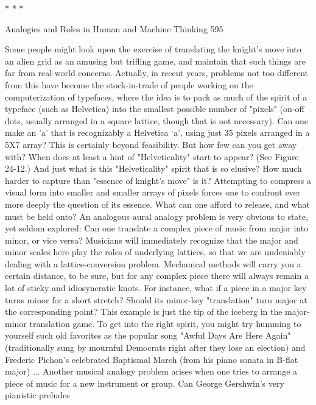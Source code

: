                                       *    *    *




Analogies and Roles in Human and Machine Thinking                                   595

        Some people might look upon the exercise of translating the knight's move
into an alien grid as an amusing but trifling game, and maintain that such things are
far from real-world concerns. Actually, in recent years, problems not too different
from this have become the stock-in-trade of people working on the computerization of
typefaces, where the idea is to pack as much of the spirit of a typeface (such as
Helvetica) into the smallest possible number of "pixels" (on-off dots, usually arranged
in a square lattice, though that is not necessary). Can one make an 'a' that is
recognizably a Helvetica `a', using just 35 pixels arranged in a 5X7 array? This is
certainly beyond feasibility. But how few can you get away with? When does at least
a hint of "Helveticality" start to appear? (See Figure 24-12.) And just what is this
"Helveticality" spirit that is so elusive? How much harder to capture than "essence of
knight's move" is it?
        Attempting to compress a visual form into smaller and smaller arrays of pixels
forces one to confront ever more deeply the question of its essence. What can one
afford to release, and what must be held onto? An analogous aural analogy problem is
very obvious to state, yet seldom explored: Can one translate a complex piece of
music from major into minor, or vice versa? Musicians will immediately recognize
that the major and minor scales here play the roles of underlying lattices, so that we
are undeniably dealing with a lattice-conversion problem. Mechanical methods will
carry you a certain distance, to be sure, but for any complex piece there will always
remain a lot of sticky and idiosyncratic knots. For instance, what if a piece in a major
key turns minor for a short stretch? Should its minor-key "translation" turn major at
the corresponding point? This example is just the tip of the iceberg in the major-minor
translation game. To get into the right spirit, you might try humming to yourself such
old favorites as the popular song "Awful Days Are Here Again" (traditionally sung by
mournful Democrats right after they lose an election) and Frederic Pichon's celebrated
Baptismal March (from his piano sonata in B-flat major) ...
        Another musical analogy problem arises when one tries to arrange a piece of
music for a new instrument or group. Can George Gershwin's very pianistic preludes
